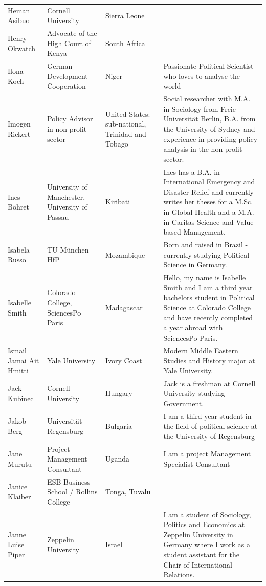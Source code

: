 \documentclass[]{article}
\begin{document}
\begin{longtable}{l>{\raggedright\arraybackslash}p{2cm}>{\raggedright\arraybackslash}p{2cm}>{\raggedright\arraybackslash}p{3cm}}
\rowcolor{gray!6}  Heman Asibuo & Cornell University & Sierra Leone & \\
Henry Okwatch & Advocate of the High Court of Kenya & South Africa & \\
\addlinespace
\rowcolor{gray!6}  Ilona Koch & German Development Cooperation & Niger & Passionate Political Scientist who loves to analyse the world\\
Imogen Rickert & Policy Advisor in non-profit sector & United States: sub-national, Trinidad and Tobago & Social researcher with M.A. in Sociology from Freie Universität Berlin, B.A. from the University of Sydney and experience in providing policy analysis in the non-profit sector.\\
\rowcolor{gray!6}  Ines Böhret & University of Manchester, University of Passau & Kiribati & Ines has a B.A. in International Emergency and Disaster Relief and currently writes her theses for a M.Sc. in Global Health and a M.A. in Caritas Science and Value-based Management.\\
Isabela Russo & TU München HfP & Mozambique & Born and raised in Brazil - currently studying Political Science in Germany.\\
\rowcolor{gray!6}  Isabelle Smith & Colorado College, SciencesPo Paris & Madagascar & Hello, my name is Isabelle Smith and I am a third year bachelors student in Political Science at Colorado College and have recently completed a year abroad with SciencesPo Paris.\\
\addlinespace
Ismail Jamai Ait Hmitti & Yale University & Ivory Coast & Modern Middle Eastern Studies and History major at Yale University.\\
\rowcolor{gray!6}  Jack Kubinec & Cornell University & Hungary & Jack is a freshman at Cornell University studying Government.\\
Jakob Berg & Universität Regensburg & Bulgaria & I am a third-year student in the field of political science at the University of Regensburg\\
\rowcolor{gray!6}  Jane Murutu & Project Management Consultant & Uganda & I am a project Management Specialist Consultant\\
Janice Klaiber & ESB Business School / Rollins College & Tonga, Tuvalu & \\
\addlinespace
\rowcolor{gray!6}  Janne Luise Piper & Zeppelin University & Israel & I am a student of Sociology, Politics and Economics at Zeppelin University in Germany where I work as a student assistant for the Chair of International Relations.\\

\end{longtable}
\end{document}
